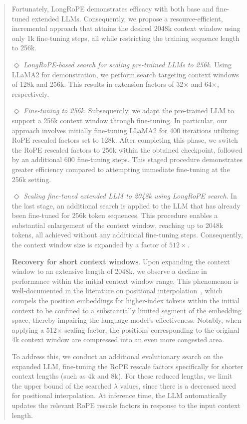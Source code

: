\begin{abstract}
Fortunately, LongRoPE demonstrates efficacy with both base and fine-tuned extended LLMs. Consequently, we propose a resource-efficient, incremental approach that attains the desired 2048k context window using only 1k fine-tuning steps, all while restricting the training sequence length to 256k.

$\Diamond$ \textit{LongRoPE-based search for scaling pre-trained LLMs to 256k}. Using LLaMA2 for demonstration, we perform search targeting context windows of 128k and 256k. This results in extension factors of 32$\times$ and 64$\times$, respectively.

$\Diamond$ \textit{Fine-tuning to 256k}. Subsequently, we adapt the pre-trained LLM to support a 256k context window through fine-tuning. In particular, our approach involves initially fine-tuning LLaMA2 for 400 iterations utilizing RoPE rescaled factors set to 128k. After completing this phase, we switch the RoPE rescaled factors to 256k within the obtained checkpoint, followed by an additional 600 fine-tuning steps. This staged procedure demonstrates greater efficiency compared to attempting immediate fine-tuning at the 256k setting.

$\Diamond$ \textit{Scaling fine-tuned extended LLM to 2048k using LongRoPE search}. In the last stage, an additional search is applied to the LLM that has already been fine-tuned for 256k token sequences. This procedure enables a substantial enlargement of the context window, reaching up to 2048k tokens, all achieved without any additional fine-tuning steps. Consequently, the context window size is expanded by a factor of $512\times$.

\textbf{Recovery for short context windows}. Upon expanding the context window to an extensive length of 2048k, we observe a decline in performance within the initial context window range. This phenomenon is well-documented in the literature on positional interpolation~\cite{pi}, which compels the position embeddings for higher-index tokens within the initial context to be confined to a substantially limited segment of the embedding space, thereby impairing the language model's effectiveness. Notably, when applying a 512$\times$ scaling factor, the positions corresponding to the original 4k context window are compressed into an even more congested area.

To address this, we conduct an additional evolutionary search on the expanded LLM, fine-tuning the RoPE rescale factors specifically for shorter context lengths (such as 4k and 8k). For these reduced lengths, we limit the upper bound of the searched $\lambda$ values, since there is a decreased need for positional interpolation. At inference time, the LLM automatically updates the relevant RoPE rescale factors in response to the input context length.


\end{abstract}
